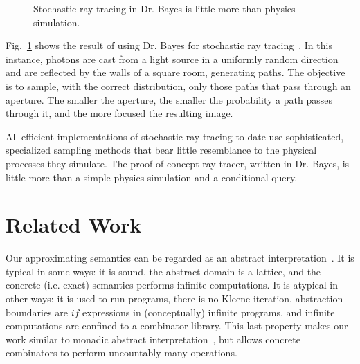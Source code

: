 \documentclass{llncs}
\newcommand{\figref}[1]{Fig.~\ref{#1}}
\begin{document}
\begin{figure}[!tb]
\caption[ ]{Stochastic ray tracing in Dr. Bayes is little more than physics simulation.}
\label{fig:ray-tracing}
\end{figure}

\figref{fig:ray-tracing} shows the result of using Dr. Bayes for stochastic ray tracing~\cite{cit:veach-1997siggraph-mlt}.
In this instance, photons are cast from a light source in a uniformly random direction and are reflected by the walls of a square room, generating paths.
The objective is to sample, with the correct distribution, only those paths that pass through an aperture.
The smaller the aperture, the smaller the probability a path passes through it, and the more focused the resulting image.

All efficient implementations of stochastic ray tracing to date use sophisticated, specialized sampling methods that bear little resemblance to the physical processes they simulate.
The proof-of-concept ray tracer, written in Dr. Bayes, is little more than a simple physics simulation and a conditional query.



\section{Related Work}

Our approximating semantics can be regarded as an abstract interpretation~\cite{cit:cousot-1977popl-abstract-interpretation}.
It is typical in some ways: it is sound, the abstract domain is a lattice, and the concrete (i.e. exact) semantics performs infinite computations.
It is atypical in other ways: it is used to run programs, there is no Kleene iteration, abstraction boundaries are $if$ expressions in (conceptually) infinite programs, and infinite computations are confined to a combinator library.
This last property makes our work similar to monadic abstract interpretation~\cite{cit:sergey-2013pldi-monadic-abstract}, but \lzfclang allows concrete combinators to perform uncountably many operations.
\end{document}
